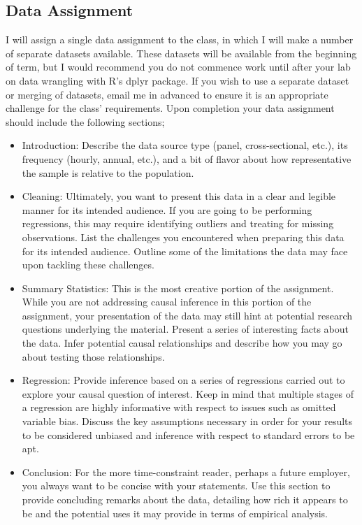 \documentclass[10pt]{article}
\begin{document}
\subsection*{Data Assignment}

I will assign a single data assignment to the class, in which I will make a number of separate datasets available.
These datasets will be available from the beginning of term, but I would recommend you do not commence work until after your lab on data wrangling with R's dplyr package.
If you wish to use a separate dataset or merging of datasets, email me in advanced to ensure it is an appropriate challenge for the class' requirements.
Upon completion your data assignment should include the following sections;
\begin{itemize}
	\setlength{\itemsep}{0pt}
	\item Introduction: Describe the data source type (panel, cross-sectional, etc.), its frequency (hourly, annual, etc.), and a bit of flavor about how representative the sample is relative to the population.
	\item Cleaning: Ultimately, you want to present this data in a clear and legible manner for its intended audience. If you are going to be performing regressions, this may require identifying outliers and treating for missing observations. 
	List the challenges you encountered when preparing this data for its intended audience. Outline some of the limitations the data may face upon tackling these challenges. 
	\item Summary Statistics: This is the most creative portion of the assignment. While you are not addressing causal inference in this portion of the assignment, your presentation of the data may still hint at potential research questions underlying the material. 
	Present a series of interesting facts about the data. Infer potential causal relationships and describe how you may go about testing those relationships.
	\item Regression: Provide inference based on a series of regressions carried out to explore your causal question of interest. Keep in mind that multiple stages of a regression are highly informative with respect to issues such as omitted variable bias.
	Discuss the key assumptions necessary in order for your results to be considered unbiased and inference with respect to standard errors to be apt. 
	\item Conclusion: For the more time-constraint reader, perhaps a future employer, you always want to be concise with your statements. Use this section to provide concluding remarks about the data, detailing how rich it appears to be and the potential uses it may provide in terms of empirical analysis.
\end{itemize}
\end{document}
